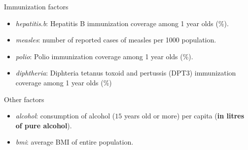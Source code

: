 Immunization factors
\begin{itemize}
	\item \textit{hepatitis.b}: Hepatitis B immunization coverage among 1 year olds (\%).
	\item \textit{measles}: number of reported cases of measles per 1000 population.
	\item \textit{polio}: Polio immunization coverage among 1 year olds (\%).
	\item \textit{diphtheria}: Diphteria tetanus toxoid and pertussis (DPT3) immunization coverage among 1 year olds (\%)
\end{itemize}

Other factors
\begin{itemize}
	\item \textit{alcohol}: consumption of alcohol ($15$ years old or more) per capita (\textbf{in litres of pure alcohol}).
	\item \textit{bmi}: average BMI of entire population.
\end{itemize}